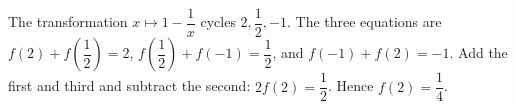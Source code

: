 The transformation $x\mapsto1-\dfrac{1}{x}$ cycles $2,\dfrac{1}{2},-1$. The three equations are $f(2)+f(\dfrac{1}{2})=2$, $f(\dfrac{1}{2})+f(-1)=\dfrac{1}{2}$, and $f(-1)+f(2)=-1$. Add the first and third and subtract the second: $2f(2)=\dfrac{1}{2}$. Hence $\boxed{f(2)=\dfrac{1}{4}}$.
